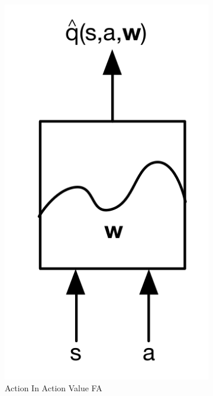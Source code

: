 \begin{figure}[H]
\begin{subfigure}[b]{0.25\textwidth}
        \includegraphics[width=\textwidth]{figures/fa-ain.png}
        \caption{Action In Action Value FA}
        \label{fig:faain}
    \end{subfigure}
    \begin{subfigure}[b]{0.3\textwidth}

\end{subfigure}
\end{figure}
